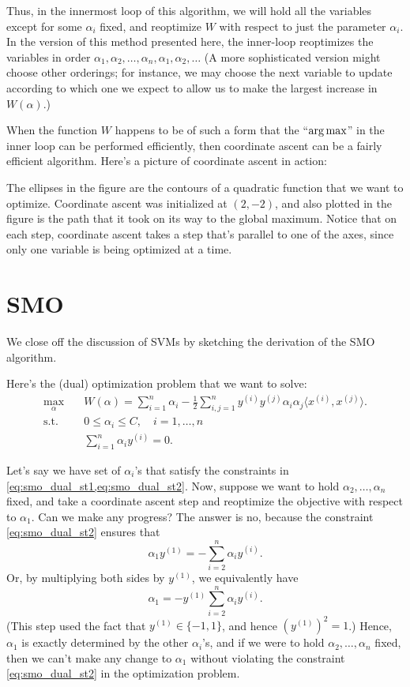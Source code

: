 Thus, in the innermost loop of this algorithm, we will hold all the variables
except for some $\alpha_i$ fixed, and reoptimize $W$ with respect to just the parameter
$\alpha_i$. In the version of this method presented here, the inner-loop reoptimizes
the variables in order $\alpha_1 ,\alpha_2 ,\ldots ,\alpha_n ,\alpha_1 ,\alpha_2 ,\ldots$  (A more sophisticated version
might choose other orderings; for instance, we may choose the next variable
to update according to which one we expect to allow us to make the largest
increase in $W(\alpha)$.)

When the function $W$ happens to be of such a form that the ``$\argmax$''
in the inner loop can be performed efficiently, then coordinate ascent can be
a fairly efficient algorithm. Here's a picture of coordinate ascent in action:

The ellipses in the figure are the contours of a quadratic function that
we want to optimize. Coordinate ascent was initialized at $(2,-2)$, and also
plotted in the figure is the path that it took on its way to the global maximum.
Notice that on each step, coordinate ascent takes a step that's parallel to one
of the axes, since only one variable is being optimized at a time.

\section{SMO}
We close off the discussion of SVMs by sketching the derivation of the SMO
algorithm.

Here's the (dual) optimization problem that we want to solve:
\begin{align}
    \max_\alpha \quad& W(\alpha) = \sum_{i=1}^n \alpha_i - \frac{1}{2} \sum_{i,j=1}^n y^{(i)} y^{(j)} \alpha_i \alpha_j \langle x^{(i)} ,x^{(j)} \rangle\label{eq:smo_dual_max}.\\
    \operatorname{s.t.} \quad& 0 \le \alpha_i \le C, \quad i = 1,\ldots,n\label{eq:smo_dual_st1}\\
    \quad& \sum_{i=1}^n \alpha_i y^{(i)} = 0\label{eq:smo_dual_st2}. 
\end{align}

Let's say we have set of $\alpha_i$'s that satisfy the constraints in \cref{eq:smo_dual_st1,eq:smo_dual_st2}. Now,
suppose we want to hold $\alpha_2 ,\ldots,\alpha_n$ fixed, and take a coordinate ascent step
and reoptimize the objective with respect to $\alpha_1$. Can we make any progress?
The answer is no, because the constraint \ref{eq:smo_dual_st2} ensures that
\begin{equation*}
    \alpha_1 y^{(1)} = -\sum_{i=2}^n \alpha_i y^{(i)}.
\end{equation*}
Or, by multiplying both sides by $y^{(1)}$, we equivalently have
\begin{equation*}
    \alpha_1 = -y^{(1)} \sum_{i=2}^n \alpha_i y^{(i)}.
\end{equation*}
(This step used the fact that $y^{(1)} \in \{-1,1\}$, and hence $(y^{(1)})^2 = 1$.) Hence,
$\alpha_1$ is exactly determined by the other $\alpha_i$'s, and if we were to hold $\alpha_2 ,\ldots,\alpha_n$
fixed, then we can't make any change to $\alpha_1$ without violating the constraint \ref{eq:smo_dual_st2} in the optimization problem.

